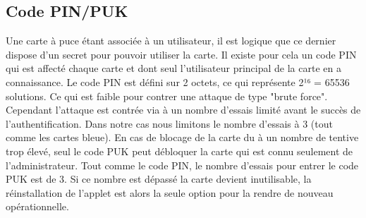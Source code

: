 \documentclass[a4paper,11pt,french]{article}
\begin{document}
\subsection{Code PIN/PUK}
Une carte à puce étant associée à un utilisateur, il est logique que ce dernier dispose d'un secret pour pouvoir utiliser
la carte. Il existe pour cela un code PIN qui est affecté chaque carte et dont seul l'utilisateur principal de la carte en a connaissance.
Le code PIN est défini sur 2 octets, ce qui représente 2¹⁶ = 65536 solutions. Ce qui est faible pour contrer une attaque de type "brute force". Cependant l'attaque est contrée via à un nombre d'essais limité avant le succès de l'authentification. Dans notre cas nous limitons
le nombre d'essais à 3 (tout comme les cartes bleue). En cas de blocage de la carte du à un nombre de tentive trop élevé, seul le code PUK
peut débloquer la carte qui est connu seulement de l'administrateur. Tout comme le code PIN, le nombre d'essais pour entrer le code PUK
est de 3. Si ce nombre est dépassé la carte devient inutilisable, la réinstallation de l'applet est alors la seule option pour la rendre
de nouveau opérationnelle.
\end{document}
